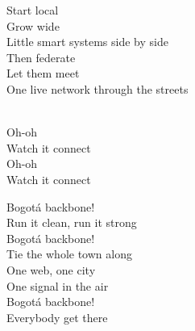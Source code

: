\begin{lyrics}
Start local\\
Grow wide\\
Little smart systems side by side\\
Then federate\\
Let them meet\\
One live network through the streets

\\
Oh-oh\\
Watch it connect\\
Oh-oh\\
Watch it connect

Bogotá backbone!\\
Run it clean, run it strong\\
Bogotá backbone!\\
Tie the whole town along\\
One web, one city\\
One signal in the air\\
Bogotá backbone!\\
Everybody get there
\end{lyrics}

